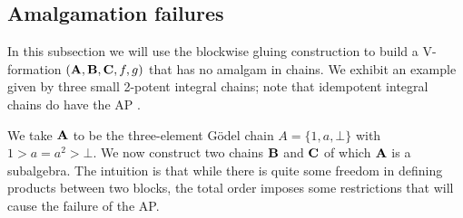 \documentclass{amsart}
\theoremstyle{definition}
\numberwithin{equation}{section}
\newcommand{\alg}[1]{{\textbf{\upshape #1}}}  %
\begin{document}
\subsection{Amalgamation failures}
In this subsection we will use the blockwise gluing construction to build a V-formation $(\alg A, \alg B, \alg C, f,g )$ that has no amalgam in chains. We exhibit an example given by three small 2-potent integral chains; note that idempotent integral chains do have the AP \cite{Gabbay, Maksimova}.

We take $\alg A$ to be the three-element G\"odel chain $A=\{1, a, \bot\}$ with $1 > a = a^2 >\bot$. We now construct two chains $\alg B$ and $\alg C$ of which $\alg A$ is a subalgebra. The intuition is that while there is quite some freedom in defining products between two blocks, the total order imposes some restrictions that will cause the failure of the AP. 
\end{document}
